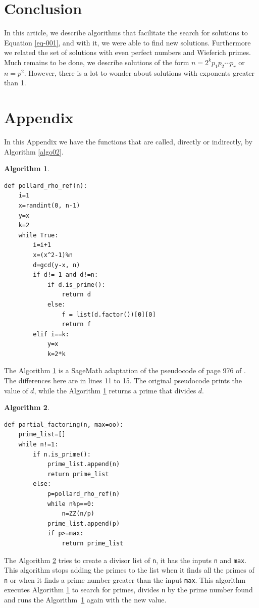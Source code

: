 \documentclass[11pt,a4paper]{article}
\newtheorem{algorithm}{Algorithm}[section]
\begin{document}
\section{Conclusion}
In this article, we describe algorithms that facilitate the search for solutions to Equation \eqref{eq-001}, and with it, we were able to find new solutions. Furthermore we related the set of solutions with even perfect numbers and Wieferich primes. Much remains to be done, we describe solutions of the form $n=2^kp_1p_2\cdots p_r$ or $n=p^2$. However, there is a lot to wonder about solutions with exponents greater than 1. 






\section{Appendix} \label{append}

In this Appendix we have the functions that are called, directly or indirectly, by Algorithm \ref{algo02}. 

\begin{algorithm}\label{algo03} \rm \footnotesize
\mbox{ }
\begin{lstlisting}
def pollard_rho_ref(n):
    i=1
    x=randint(0, n-1)
    y=x
    k=2
    while True:
        i=i+1
        x=(x^2-1)%n
        d=gcd(y-x, n)
        if d!= 1 and d!=n:
            if d.is_prime():
                return d
            else:
                f = list(d.factor())[0][0]
                return f
        elif i==k:
            y=x
            k=2*k
\end{lstlisting}
\end{algorithm}
The Algorithm \ref{algo03} is a SageMath adaptation of the pseudocode of page 976 of \cite{CORMEN}. The differences here are in lines 11 to 15. The original pseudocode prints the value of $d$, while the Algorithm \ref{algo03} returns a prime that divides $d$.
 
\begin{algorithm}\label{algo004} \rm \footnotesize
\mbox{ }
\begin{lstlisting}
def partial_factoring(n, max=oo):
    prime_list=[]
    while n!=1:
        if n.is_prime():
            prime_list.append(n)
            return prime_list
        else:
            p=pollard_rho_ref(n)
            while n%p==0:
                n=ZZ(n/p)
            prime_list.append(p)
            if p>=max:
                return prime_list
\end{lstlisting}
 \end{algorithm}
The Algorithm \ref{algo004} tries to create a divisor list of \verb|n|, it has the inputs \verb|n| and \verb|max|. This algorithm stops adding the primes to the list when it finds all the primes of \verb|n| or when it finds a prime number greater than the input \verb|max|. This algorithm executes Algorithm \ref{algo03} to search for primes, divides \verb|n| by the prime number found and runs the Algorithm~\ref{algo03} again with the new value.
\end{document}
